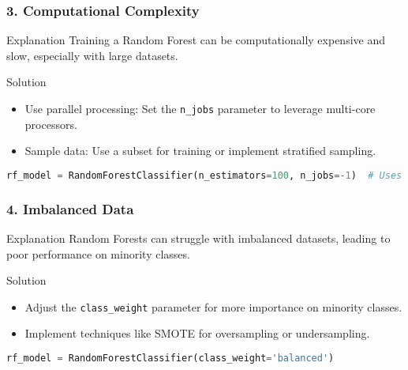 \documentclass[aspectratio=169]{beamer}
\begin{document}
\begin{frame}
    \frametitle{3. Computational Complexity}
    \begin{block}{Explanation}
        Training a Random Forest can be computationally expensive and slow, especially with large datasets.
    \end{block}
    \begin{block}{Solution}
        \begin{itemize}
            \item Use parallel processing: Set the \texttt{n\_jobs} parameter to leverage multi-core processors.
            \item Sample data: Use a subset for training or implement stratified sampling.
        \end{itemize}
    \end{block}
    \begin{lstlisting}[language=Python]
rf_model = RandomForestClassifier(n_estimators=100, n_jobs=-1)  # Uses all available cores
    \end{lstlisting}
\end{frame}

\begin{frame}
    \frametitle{4. Imbalanced Data}
    \begin{block}{Explanation}
        Random Forests can struggle with imbalanced datasets, leading to poor performance on minority classes.
    \end{block}
    \begin{block}{Solution}
        \begin{itemize}
            \item Adjust the \texttt{class\_weight} parameter for more importance on minority classes.
            \item Implement techniques like SMOTE for oversampling or undersampling.
        \end{itemize}
    \end{block}
    \begin{lstlisting}[language=Python]
rf_model = RandomForestClassifier(class_weight='balanced')
    \end{lstlisting}
\end{frame}
\end{document}
